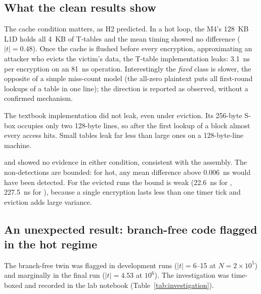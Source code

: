\subsection{What the clean results show}

The cache condition matters, as H2 predicted. In a hot loop, the M4's 128~KB L1D holds all 4~KB of T-tables and the mean timing showed no difference ($\lvert t\rvert = 0.48$). Once the cache is flushed before every encryption, approximating an attacker who evicts the victim's data, the T-table implementation leaks: 3.1~ns per encryption on an 81~ns operation. Interestingly the \emph{fixed} class is slower, the opposite of a simple miss-count model (the all-zero plaintext puts all first-round lookups of a table in one line); the direction is reported as observed, without a confirmed mechanism.

The textbook  implementation did not leak, even under eviction. Its 256-byte S-box occupies only two 128-byte lines, so after the first lookup of a block almost every access hits. Small tables leak far less than large ones on a 128-byte-line machine.

 and  showed no evidence in either condition, consistent with the assembly. The non-detections are bounded: for  hot, any mean difference above 0.006~ns would have been detected. For the evicted runs the bound is weak (22.6~ns for , 227.5~ns for ), because a single encryption lasts less than one timer tick and eviction adds large variance.

\subsection{An unexpected result: branch-free code flagged in the hot regime}
\label{sec:unexpected}

The branch-free twin was flagged in development runs ($\lvert t\rvert = 6$--15 at $N = 2\times10^5$) and marginally in the final run ($\lvert t\rvert = 4.53$ at $10^6$). The investigation was time-boxed and recorded in the lab notebook (Table~\ref{tab:investigation}).


